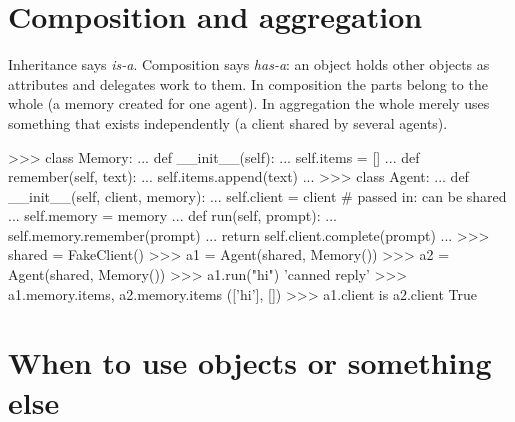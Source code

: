 \section{Composition and aggregation}

Inheritance says \emph{is-a}. Composition says \emph{has-a}: an object holds other objects as
attributes and delegates work to them. In composition the parts belong to the whole (a memory
created for one agent). In aggregation the whole merely uses something that exists independently
(a client shared by several agents).

\begin{center}
\end{center}

\begin{pycode}
>>> class Memory:
...     def __init__(self):
...         self.items = []
...     def remember(self, text):
...         self.items.append(text)
...
>>> class Agent:
...     def __init__(self, client, memory):
...         self.client = client               # passed in: can be shared
...         self.memory = memory
...     def run(self, prompt):
...         self.memory.remember(prompt)
...         return self.client.complete(prompt)
...
>>> shared = FakeClient()
>>> a1 = Agent(shared, Memory())
>>> a2 = Agent(shared, Memory())
>>> a1.run("hi")
'canned reply'
>>> a1.memory.items, a2.memory.items
(['hi'], [])
>>> a1.client is a2.client
True
\end{pycode}

\section{When to use objects or something else}

